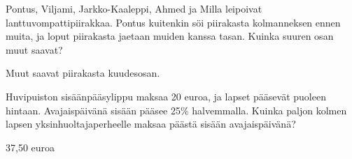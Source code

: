 \begin{tehtava} %
    Pontus, Viljami, Jarkko-Kaaleppi, Ahmed ja Milla leipoivat lanttuvompattipiirakkaa.
    Pontus kuitenkin söi piirakasta kolmanneksen ennen muita, ja loput piirakasta
    jaetaan muiden kanssa tasan. Kuinka suuren osan muut saavat?
    
    \begin{vastaus}
        Muut saavat piirakasta kuudesosan.
    \end{vastaus}
\end{tehtava}

\begin{tehtava} %
    Huvipuiston sisäänpääsylippu maksaa 20 euroa, ja lapset pääsevät puoleen
    hintaan. Avajaispäivänä sisään pääsee 25\% halvemmalla. Kuinka paljon kolmen
    lapsen yksinhuoltajaperheelle maksaa päästä sisään avajaispäivänä?
    
    \begin{vastaus}
        37,50 euroa
    \end{vastaus}
\end{tehtava}
